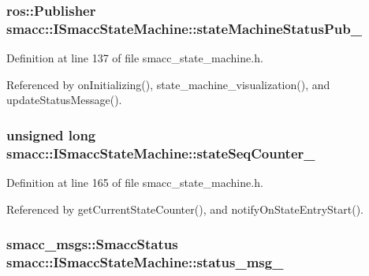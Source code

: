 \subsubsection[{\texorpdfstring{state\+Machine\+Status\+Pub\+\_\+}{stateMachineStatusPub_}}]{\setlength{\rightskip}{0pt plus 5cm}ros\+::\+Publisher smacc\+::\+I\+Smacc\+State\+Machine\+::state\+Machine\+Status\+Pub\+\_\+\hspace{0.3cm}{\ttfamily [protected]}}\hypertarget{classsmacc_1_1ISmaccStateMachine_a55a7c7b26ad4dfea441c62c6326a5414}{}\label{classsmacc_1_1ISmaccStateMachine_a55a7c7b26ad4dfea441c62c6326a5414}


Definition at line 137 of file smacc\+\_\+state\+\_\+machine.\+h.



Referenced by on\+Initializing(), state\+\_\+machine\+\_\+visualization(), and update\+Status\+Message().

\subsubsection[{\texorpdfstring{state\+Seq\+Counter\+\_\+}{stateSeqCounter_}}]{\setlength{\rightskip}{0pt plus 5cm}unsigned long smacc\+::\+I\+Smacc\+State\+Machine\+::state\+Seq\+Counter\+\_\+\hspace{0.3cm}{\ttfamily [private]}}\hypertarget{classsmacc_1_1ISmaccStateMachine_ab41ee07d20715142e2f7c92d551b2bd6}{}\label{classsmacc_1_1ISmaccStateMachine_ab41ee07d20715142e2f7c92d551b2bd6}


Definition at line 165 of file smacc\+\_\+state\+\_\+machine.\+h.



Referenced by get\+Current\+State\+Counter(), and notify\+On\+State\+Entry\+Start().

\subsubsection[{\texorpdfstring{status\+\_\+msg\+\_\+}{status_msg_}}]{\setlength{\rightskip}{0pt plus 5cm}smacc\+\_\+msgs\+::\+Smacc\+Status smacc\+::\+I\+Smacc\+State\+Machine\+::status\+\_\+msg\+\_\+\hspace{0.3cm}{\ttfamily [protected]}}\hypertarget{classsmacc_1_1ISmaccStateMachine_a4f47dd614f12a95e7a3c46d465ce4b13}{}\label{classsmacc_1_1ISmaccStateMachine_a4f47dd614f12a95e7a3c46d465ce4b13}


